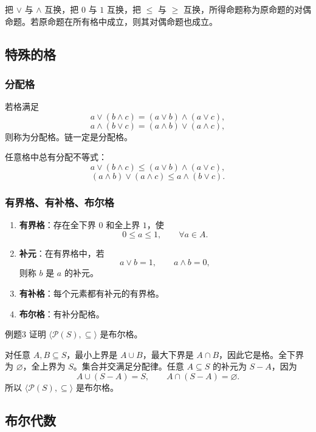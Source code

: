 把 \(\vee\) 与 \(\wedge\) 互换，把 \(0\) 与 \(1\) 互换，把 \(\le\) 与 \(\ge\) 互换，所得命题称为原命题的对偶命题。若原命题在所有格中成立，则其对偶命题也成立。

\subsection{特殊的格}

\subsubsection{分配格}

若格满足
\[
a\vee(b\wedge c)=(a\vee b)\wedge(a\vee c),
\]
\[
a\wedge(b\vee c)=(a\wedge b)\vee(a\wedge c),
\]
则称为分配格。链一定是分配格。

任意格中总有分配不等式：
\[
a\vee(b\wedge c)\le (a\vee b)\wedge(a\vee c),
\]
\[
(a\wedge b)\vee(a\wedge c)\le a\wedge(b\vee c).
\]

\subsubsection{有界格、有补格、布尔格}

\begin{enumerate}
	\item \textbf{有界格}：存在全下界 \(0\) 和全上界 \(1\)，使
	\[
	0\le a\le1,\qquad \forall a\in A.
	\]
	\item \textbf{补元}：在有界格中，若
	\[
	a\vee b=1,\qquad a\wedge b=0,
	\]
	则称 \(b\) 是 \(a\) 的补元。
	\item \textbf{有补格}：每个元素都有补元的有界格。
	\item \textbf{布尔格}：有补分配格。
\end{enumerate}

\begin{question}{例题3}
	证明 \(\langle\mathcal{P}(S),\subseteq\rangle\) 是布尔格。
	
	\begin{solution}
	对任意 \(A,B\subseteq S\)，最小上界是 \(A\cup B\)，最大下界是 \(A\cap B\)，因此它是格。全下界为 \(\varnothing\)，全上界为 \(S\)。集合并交满足分配律。任意 \(A\subseteq S\) 的补元为 \(S-A\)，因为
	\[
	A\cup(S-A)=S,\qquad A\cap(S-A)=\varnothing.
	\]
	所以 \(\langle\mathcal{P}(S),\subseteq\rangle\) 是布尔格。
	\end{solution}
\end{question}

\subsection{布尔代数}

